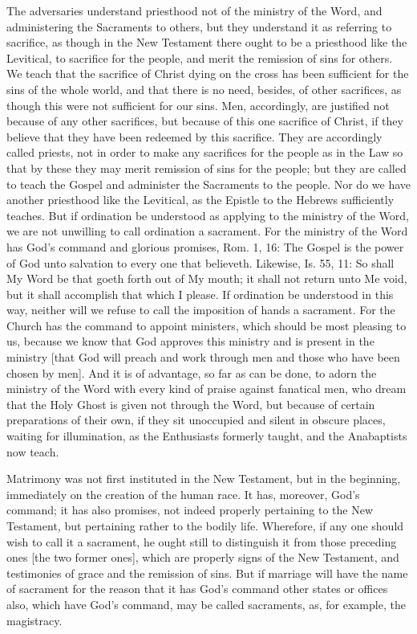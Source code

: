 The adversaries understand priesthood not of the ministry of the Word,
and administering the Sacraments to others, but they understand it
as referring to sacrifice, as though in the New Testament there ought
to be a priesthood like the Levitical, to sacrifice for the people,
and merit the remission of sins for others.  We teach that the
sacrifice of Christ dying on the cross has been sufficient for the
sins of the whole world, and that there is no need, besides, of other
sacrifices, as though this were not sufficient for our sins.  Men,
accordingly, are justified not because of any other sacrifices, but
because of this one sacrifice of Christ, if they believe that they
have been redeemed by this sacrifice.  They are accordingly called
priests, not in order to make any sacrifices for the people as in the
Law so that by these they may merit remission of sins for the people;
but they are called to teach the Gospel and administer the Sacraments
to the people.  Nor do we have another priesthood like the Levitical,
as the Epistle to the Hebrews sufficiently teaches.  But if
ordination be understood as applying to the ministry of the Word, we
are not unwilling to call ordination a sacrament.  For the ministry
of the Word has God's command and glorious promises, Rom. 1, 16: The
Gospel is the power of God unto salvation to every one that believeth.
Likewise, Is. 55, 11: So shall My Word be that goeth forth out of
My mouth; it shall not return unto Me void, but it shall accomplish
that which I please.  If ordination be understood in this way,
neither will we refuse to call the imposition of hands a sacrament.
For the Church has the command to appoint ministers, which should be
most pleasing to us, because we know that God approves this ministry
and is present in the ministry [that God will preach and work through
men and those who have been chosen by men].  And it is of advantage,
so far as can be done, to adorn the ministry of the Word with every
kind of praise against fanatical men, who dream that the Holy Ghost
is given not through the Word, but because of certain preparations of
their own, if they sit unoccupied and silent in obscure places,
waiting for illumination, as the Enthusiasts formerly taught, and the
Anabaptists now teach.

Matrimony was not first instituted in the New Testament, but in the
beginning, immediately on the creation of the human race.  It has,
moreover, God's command; it has also promises, not indeed properly
pertaining to the New Testament, but pertaining rather to the bodily
life.  Wherefore, if any one should wish to call it a sacrament, he
ought still to distinguish it from those preceding ones [the two
former ones], which are properly signs of the New Testament, and
testimonies of grace and the remission of sins.  But if marriage will
have the name of sacrament for the reason that it has God's command
other states or offices also, which have God's command, may be called
sacraments, as, for example, the magistracy.

